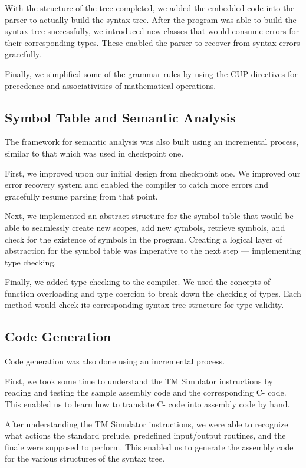 \documentclass[12pt, letterpaper]{article}
\begin{document}
With the structure of the tree completed, we added the embedded code into the parser
to actually build the syntax tree. After the program was able to build the syntax tree successfully, we introduced new classes that would consume errors for their corresponding
types. These enabled the parser to recover from syntax errors gracefully.

Finally, we simplified some of the grammar rules by using the CUP directives for
precedence and associativities of mathematical operations.

\subsection{Symbol Table and Semantic Analysis}
The framework for semantic analysis was also built using an incremental process, similar to that which was used in checkpoint one.

First, we improved upon our initial design from checkpoint one. We improved our error recovery system and enabled the compiler to catch more errors and gracefully resume parsing from that point.

Next, we implemented an abstract structure for the symbol table that would be able to seamlessly create new scopes, add new symbols, retrieve symbols, and check for the existence of symbols in the program. Creating a logical layer of abstraction for the symbol table was imperative to the next step --- implementing type checking.

Finally, we added type checking to the compiler. We used the concepts of function overloading and type coercion to break down the checking of types. Each method would check its corresponding syntax tree structure for type validity.

\subsection{Code Generation}
Code generation was also done using an incremental process.

First, we took some time to understand the TM Simulator instructions by reading and testing the sample assembly code and the corresponding C- code. This enabled us to learn how to translate C- code into assembly code by hand. 

After understanding the TM Simulator instructions, we were able to recognize what actions the standard prelude, predefined input/output routines, and the finale were supposed to perform. This enabled us to generate the assembly code for the various structures of the syntax tree.
\end{document}

